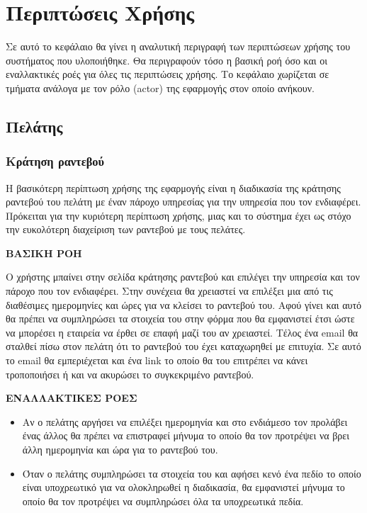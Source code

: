 
\chapter{Περιπτώσεις Χρήσης}
Σε αυτό το κεφάλαιο θα γίνει η αναλυτική περιγραφή των περιπτώσεων χρήσης του συστήματος που υλοποιήθηκε. Θα περιγραφούν τόσο η βασική ροή όσο και οι εναλλακτικές ροές για όλες τις περιπτώσεις χρήσης. Το κεφάλαιο χωρίζεται σε τμήματα ανάλογα με τον ρόλο (actor) της εφαρμογής στον οποίο ανήκουν.

\section{Πελάτης}
\subsection{Κράτηση ραντεβού}
Η βασικότερη περίπτωση χρήσης της εφαρμογής είναι η διαδικασία της κράτησης ραντεβού του πελάτη με έναν πάροχο υπηρεσίας για την υπηρεσία που τον ενδιαφέρει. Πρόκειται για την κυριότερη περίπτωση χρήσης, μιας και το σύστημα έχει ως στόχο την ευκολότερη διαχείριση των ραντεβού με τους πελάτες. 

\textbf{ΒΑΣΙΚΗ ΡΟΗ}

Ο χρήστης μπαίνει στην σελίδα κράτησης ραντεβού και επιλέγει την υπηρεσία και τον πάροχο που τον ενδιαφέρει. Στην συνέχεια θα χρειαστεί να επιλέξει μια από τις διαθέσιμες ημερομηνίες και ώρες για να κλείσει το ραντεβού του. Αφού γίνει και αυτό θα πρέπει να συμπληρώσει τα στοιχεία του στην φόρμα που θα εμφανιστεί έτσι ώστε να μπορέσει η εταιρεία να έρθει σε επαφή μαζί του αν χρειαστεί. Τέλος ένα email θα σταλθεί πίσω στον πελάτη ότι το ραντεβού του έχει καταχωρηθεί με επιτυχία. Σε αυτό το email θα εμπεριέχεται και ένα link το οποίο θα του επιτρέπει να κάνει τροποποιήσει ή και να ακυρώσει το συγκεκριμένο ραντεβού.

\textbf{ΕΝΑΛΛΑΚΤΙΚΕΣ ΡΟΕΣ}

\begin{itemize}
\item Αν ο πελάτης αργήσει να επιλέξει ημερομηνία και στο ενδιάμεσο τον προλάβει ένας άλλος θα πρέπει να επιστραφεί μήνυμα το οποίο θα τον προτρέψει να βρει άλλη ημερομηνία και ώρα για το ραντεβού του.
\item Όταν ο πελάτης συμπληρώσει τα στοιχεία του και αφήσει κενό ένα πεδίο το οποίο είναι υποχρεωτικό για να ολοκληρωθεί η διαδικασία, θα εμφανιστεί μήνυμα το οποίο θα τον προτρέψει να συμπληρώσει όλα τα υποχρεωτικά πεδία.
\end{itemize}

